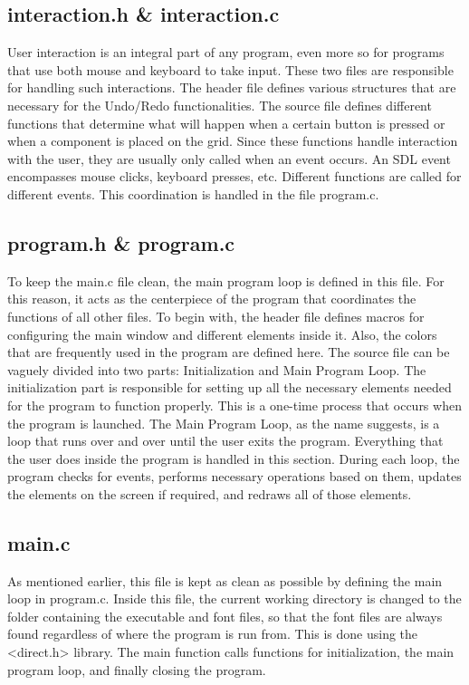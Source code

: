 \documentclass[report]{subfiles}
\begin{document}
    \subsection{interaction.h \& interaction.c}
    User interaction is an integral part of any program, even more so for programs that use both mouse and keyboard to take input. These two files are responsible for handling such interactions. The header file defines various structures that are necessary for the Undo/Redo functionalities.
    The source file defines different functions that determine what will happen when a certain button is pressed or when a component is placed on the grid. Since these functions handle interaction with the user, they are usually only called when an event occurs. An SDL event encompasses mouse clicks, keyboard presses, etc. Different functions are called for different events. This coordination is handled in the file program.c.
    \subsection{program.h \& program.c}
    To keep the main.c file clean, the main program loop is defined in this file. For this reason, it acts as the centerpiece of the program that coordinates the functions of all other files. To begin with, the header file defines macros for configuring the main window and different elements inside it. Also, the colors that are frequently used in the program are defined here.
    The source file can be vaguely divided into two parts: Initialization and Main Program Loop. The initialization part is responsible for setting up all the necessary elements needed for the program to function properly. This is a one-time process that occurs when the program is launched.
    The Main Program Loop, as the name suggests, is a loop that runs over and over until the user exits the program. Everything that the user does inside the program is handled in this section. During each loop, the program checks for events, performs necessary operations based on them, updates the elements on the screen if required, and redraws all of those elements.
    \subsection{main.c}
    As mentioned earlier, this file is kept as clean as possible by defining the main loop in program.c. Inside this file, the current working directory is changed to the folder containing the executable and font files, so that the font files are always found regardless of where the program is run from. This is done using the <direct.h> library.
    The main function calls functions for initialization, the main program loop, and finally closing the program.
\end{document}
